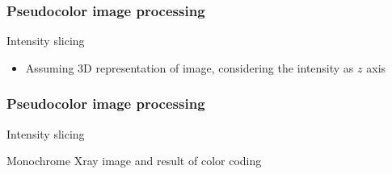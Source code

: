 \documentclass{beamer}
\begin{document}
\begin{frame}

\frametitle{Pseudocolor image processing}
\begin{block}{Intensity slicing}
\footnotesize{
\begin{itemize}
\item Assuming 3D representation of image, considering the intensity as $z$ axis 
\end{itemize}
}
\end{block}
\end{frame}
\begin{frame}
\frametitle{Pseudocolor image processing}
\begin{block}{Intensity slicing}
\begin{itemize}
\footnotesize{\item Monochrome Xray image and result of color coding}
\end{itemize}
\end{block}
\end{frame}
\end{document}

